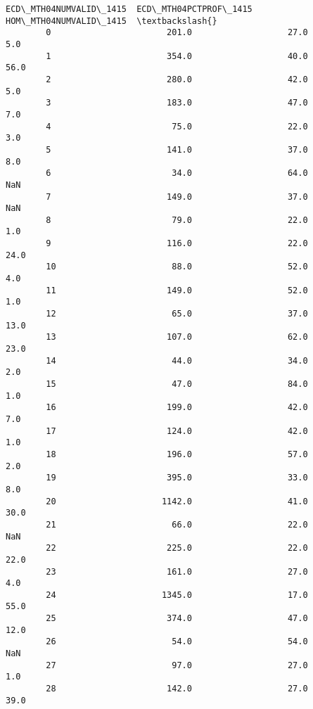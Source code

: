 \documentclass[11pt]{article}
\begin{document}
\begin{Verbatim}[commandchars=\\\{\}]
               ECD\_MTH04NUMVALID\_1415  ECD\_MTH04PCTPROF\_1415  HOM\_MTH04NUMVALID\_1415  \textbackslash{}
        0                       201.0                   27.0                     5.0   
        1                       354.0                   40.0                    56.0   
        2                       280.0                   42.0                     5.0   
        3                       183.0                   47.0                     7.0   
        4                        75.0                   22.0                     3.0   
        5                       141.0                   37.0                     8.0   
        6                        34.0                   64.0                     NaN   
        7                       149.0                   37.0                     NaN   
        8                        79.0                   22.0                     1.0   
        9                       116.0                   22.0                    24.0   
        10                       88.0                   52.0                     4.0   
        11                      149.0                   52.0                     1.0   
        12                       65.0                   37.0                    13.0   
        13                      107.0                   62.0                    23.0   
        14                       44.0                   34.0                     2.0   
        15                       47.0                   84.0                     1.0   
        16                      199.0                   42.0                     7.0   
        17                      124.0                   42.0                     1.0   
        18                      196.0                   57.0                     2.0   
        19                      395.0                   33.0                     8.0   
        20                     1142.0                   41.0                    30.0   
        21                       66.0                   22.0                     NaN   
        22                      225.0                   22.0                    22.0   
        23                      161.0                   27.0                     4.0   
        24                     1345.0                   17.0                    55.0   
        25                      374.0                   47.0                    12.0   
        26                       54.0                   54.0                     NaN   
        27                       97.0                   27.0                     1.0   
        28                      142.0                   27.0                    39.0   

\end{Verbatim}
\end{document}
